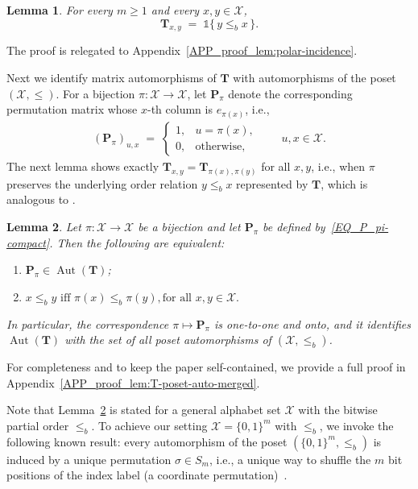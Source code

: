\documentclass[onecolumn]{IEEEtran} %
\newcommand{\1}{\mathbbm{1}}
\DeclareMathOperator{\Aut}{Aut}
\theoremstyle{boldremark}
\newtheorem{lemma}{Lemma}
\begin{document}
\begin{lemma}\label{lem:polar-incidence}
For every $m\ge 1$ and every $x,y\in\mathcal{X}$,
\begin{equation}\label{eq:T-encodes-order-compact}
  \mathbf T_{x,y}
  \;=\;  \mathds{1}\{\,y \le_b x\,\}.
\end{equation}
\end{lemma}

The proof is relegated to Appendix~\ref{APP_proof_lem:polar-incidence}.

Next we identify matrix automorphisms of \(\mathbf T\) with automorphisms of the
poset \((\mathcal X,\le)\).
For a bijection \(\pi:\mathcal X\to\mathcal X\), let \(\mathbf P_\pi\) denote the
corresponding permutation matrix whose \(x\)-th column is \(e_{\pi(x)}\), i.e.,
\begin{align}\label{EQ_P_pi-compact}
  (\mathbf P_\pi)_{u,x}
  \;=\;
  \begin{cases}
    1, & u = \pi(x),\\
    0, & \text{otherwise},
  \end{cases}
  \qquad u,x\in\mathcal X.
\end{align}
The next lemma shows exactly \(\mathbf T_{x,y}=\mathbf T_{\pi(x),\pi(y)}\) for all \(x,y\), i.e., when \(\pi\) preserves the underlying order relation \(y\le_b x\) represented by \(\mathbf T\), which is analogous to \cite[Thm.~2.1.6]{Knauer2011AGT}. 




\begin{lemma}\label{lem:T-poset-auto-merged}
Let \(\pi:\mathcal{X}\to\mathcal{X}\) be a bijection and let \(\mathbf P_\pi\)
be defined by~\eqref{EQ_P_pi-compact}. Then the following are equivalent:
\begin{enumerate}
  \item \(\mathbf P_\pi\in\Aut(\mathbf T)\);
  \item   $x\le_b y \mbox{ iff } \pi(x)\le_b \pi(y),\text{for all }x,y\in\mathcal{X}.$
\end{enumerate}
In particular, the correspondence \(\pi \mapsto \mathbf P_\pi\) is one-to-one and onto, and it
identifies \(\Aut(\mathbf T)\) with the set of all poset automorphisms of \((\mathcal{X},\le_b)\).
\end{lemma}


For completeness and to keep the paper self-contained, we provide a full proof in Appendix~\ref{APP_proof_lem:T-poset-auto-merged}.

Note that Lemma~\ref{lem:T-poset-auto-merged} is stated for a general alphabet set \(\mathcal X\)
with the bitwise partial order \(\le_b\). To achieve our setting \(\mathcal X=\{0,1\}^m\) with \(\le_b\), we invoke the following known result: every automorphism of the poset \((\{0,1\}^m,\le_b)\) is induced by a unique permutation \(\sigma\in S_m\), i.e., a unique way to shuffle the \(m\) bit
positions of the index label (a coordinate permutation)~\cite[p.~44]{StanleyAlgComb}.
\end{document}
